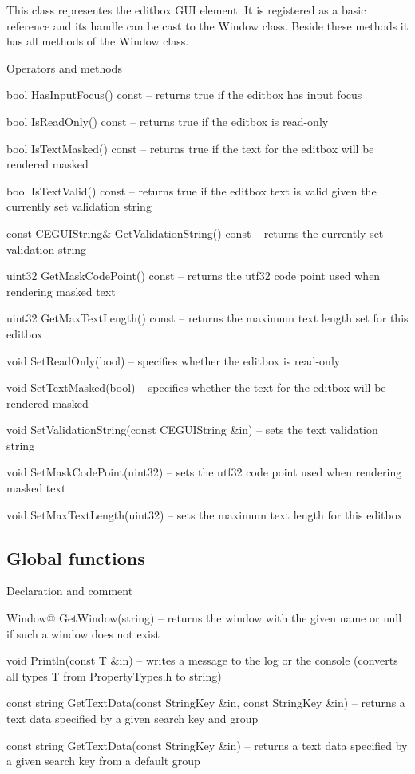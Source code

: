This class representes the editbox GUI element. It is registered as a basic reference and its handle can be cast to the Window class. Beside these methods it has all methods of the Window class.

\begin{titled-itemize}{Operators and methods}
  \item bool HasInputFocus() const -- returns true if the editbox has input focus
  \item bool IsReadOnly() const -- returns true if the editbox is read-only
  \item bool IsTextMasked() const -- returns true if the text for the editbox will be rendered masked
  \item bool IsTextValid() const -- returns true if the editbox text is valid given the currently set
 validation string
  \item const CEGUIString\& GetValidationString() const -- returns the currently set validation string
  \item uint32 GetMaskCodePoint() const -- returns the utf32 code point used when rendering masked text
  \item uint32 GetMaxTextLength() const -- returns the maximum text length set for this editbox
  \item void SetReadOnly(bool) -- specifies whether the editbox is read-only
  \item void SetTextMasked(bool) -- specifies whether the text for the editbox will be rendered masked
  \item void SetValidationString(const CEGUIString \&in) -- sets the text validation string
  \item void SetMaskCodePoint(uint32) -- sets the utf32 code point used when rendering masked text
  \item void SetMaxTextLength(uint32) -- sets the maximum text length for this editbox
\end{titled-itemize}

\subsection{Global functions}

\begin{titled-itemize}{Declaration and comment}
  \item Window@ GetWindow(string) -- returns the window with the given name or null if such a window does not exist
  \item void Println(const T \&in) -- writes a message to the log or the console (converts all types T from PropertyTypes.h to string)
  \item const string GetTextData(const StringKey \&in, const StringKey \&in) -- returns a text data specified by a given search key and group
  \item const string GetTextData(const StringKey \&in) -- returns a text data specified by a given search key from a default group
\end{titled-itemize}

